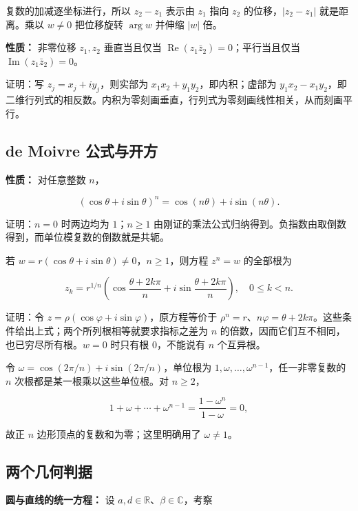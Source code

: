 \documentclass[11pt,a4paper]{article}
\begin{document}
复数的加减逐坐标进行，所以 \(z_2-z_1\) 表示由 \(z_1\) 指向 \(z_2\)
的位移，\(|z_2-z_1|\) 就是距离。乘以 \(w\ne0\) 把位移旋转 \(\arg w\)
并伸缩 \(|w|\) 倍。

\textbf{性质：} 非零位移 \(z_1,z_2\) 垂直当且仅当
\(\operatorname{Re}(z_1\bar z_2)=0\)；平行当且仅当
\(\operatorname{Im}(z_1\bar z_2)=0\)。

证明：写 \(z_j=x_j+iy_j\)，则实部为 \(x_1x_2+y_1y_2\)，即内积；虚部为
\(y_1x_2-x_1y_2\)，即二维行列式的相反数。内积为零刻画垂直，行列式为零刻画线性相关，从而刻画平行。

\subsection{de Moivre
公式与开方}\label{de-moivre-ux516cux5f0fux4e0eux5f00ux65b9}

\textbf{性质：} 对任意整数 \(n\)，

\[
(\cos\theta+i\sin\theta)^n=\cos(n\theta)+i\sin(n\theta).
\]

证明：\(n=0\) 时两边均为 \(1\)；\(n\ge1\)
由刚证的乘法公式归纳得到。负指数由取倒数得到，而单位模复数的倒数就是共轭。

若 \(w=r(\cos\theta+i\sin\theta)\ne0\)，\(n\ge1\)，则方程 \(z^n=w\)
的全部根为

\[
z_k=r^{1/n}\left(\cos\frac{\theta+2k\pi}{n}
+i\sin\frac{\theta+2k\pi}{n}\right),\quad 0\le k<n.
\]

证明：令 \(z=\rho(\cos\varphi+i\sin\varphi)\)，原方程等价于
\(\rho^n=r\)、\(n\varphi=\theta+2k\pi\)。这些条件给出上式；两个所列根相等就要求指标之差为
\(n\) 的倍数，因而它们互不相同，也已穷尽所有根。\(w=0\) 时只有根
\(0\)，不能说有 \(n\) 个互异根。

令 \(\omega=\cos(2\pi/n)+i\sin(2\pi/n)\)，单位根为
\(1,\omega,\ldots,\omega^{n-1}\)，任一非零复数的 \(n\)
次根都是某一根乘以这些单位根。对 \(n\ge2\)，

\[
1+\omega+\cdots+\omega^{n-1}=\frac{1-\omega^n}{1-\omega}=0,
\]

故正 \(n\) 边形顶点的复数和为零；这里明确用了 \(\omega\ne1\)。

\subsection{两个几何判据}\label{ux4e24ux4e2aux51e0ux4f55ux5224ux636e}

\textbf{圆与直线的统一方程：} 设
\(a,d\in\mathbb R\)、\(\beta\in\mathbb C\)，考察
\end{document}
